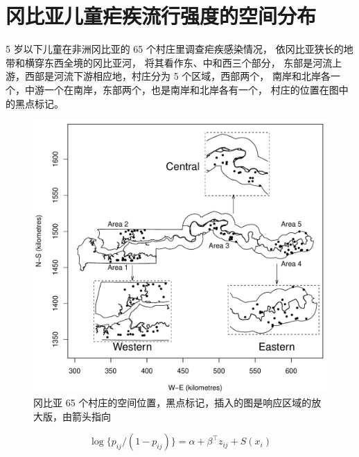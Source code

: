 \documentclass[12pt,a4paper,UTF8,twoside]{book}
\theoremstyle{definition}
\theoremstyle{definition}
\theoremstyle{definition}
\theoremstyle{remark}
\begin{document}
\hypertarget{case-gambia}{%
\section{冈比亚儿童疟疾流行强度的空间分布}\label{case-gambia}}

5 岁以下儿童在非洲冈比亚的 65 个村庄里调查疟疾感染情况，
依冈比亚狭长的地带和横穿东西全境的冈比亚河，
将其看作东、中和西三个部分，
东部是河流上游，西部是河流下游相应地，村庄分为 5 个区域，西部两个，
南岸和北岸各一个，中游一个在南岸，东部两个，也是南岸和北岸各有一个，
村庄的位置在图中的黑点标记。

\begin{figure}

{\centering \includegraphics[width=0.7\linewidth]{figures/gambia-map} 

}

\caption{冈比亚 65 个村庄的空间位置，黑点标记，插入的图是响应区域的放大版，由箭头指向}\label{fig:childhood-malaria}
\end{figure}

\begin{equation}
\log\{p_{ij}/(1-p_{ij})\} = \alpha + \beta^{\top}z_{ij} + S(x_i) \label{eq:gambia-without-nugget-effect}
\end{equation}
\end{document}
